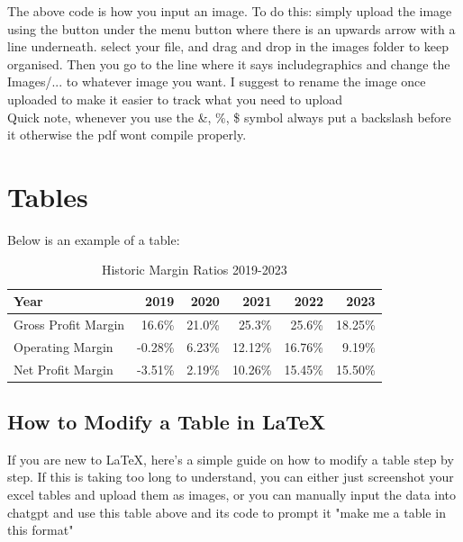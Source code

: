 \documentclass[a4paper,num-refs]{oup-contemporary}
\begin{document}
The above code is how you input an image. To do this: simply upload the image using the button under the menu button where there is an upwards arrow with a line underneath. select your file, and drag and drop in the images folder to keep organised. Then you go to the line where it says includegraphics and change the Images/... to whatever image you want. I suggest to rename the image once uploaded to make it easier to track what you need to upload \\

Quick note, whenever you use the \&, \%, \$ symbol always put a backslash before it otherwise the pdf wont compile properly.\\

\section{Tables}

Below is an example of a table: 

\begin{table}[b!]
\caption{Historic Margin Ratios 2019-2023}\label{tab:example}
\setlength\tabcolsep{3pt} %
\begin{tabular}{l r r r r r} %
\toprule
Year & 2019 & 2020 & 2021 & 2022 & 2023 \\
\midrule
Gross Profit Margin & 16.6\% & 21.0\% & 25.3\% & 25.6\% & 18.25\% \\
Operating Margin & -0.28\% & 6.23\% & 12.12\% & 16.76\% & 9.19\% \\
Net Profit Margin & -3.51\% & 2.19\% & 10.26\% & 15.45\% & 15.50\% \\
\bottomrule
\end{tabular}
\end{table}

\subsection{How to Modify a Table in LaTeX}

If you are new to LaTeX, here’s a simple guide on how to modify a table step by step. If this is taking too long to understand, you can either just screenshot your excel tables and upload them as images, or you can manually input the data into chatgpt and use this table above and its code to prompt it "make me a table in this format" 
\end{document}
